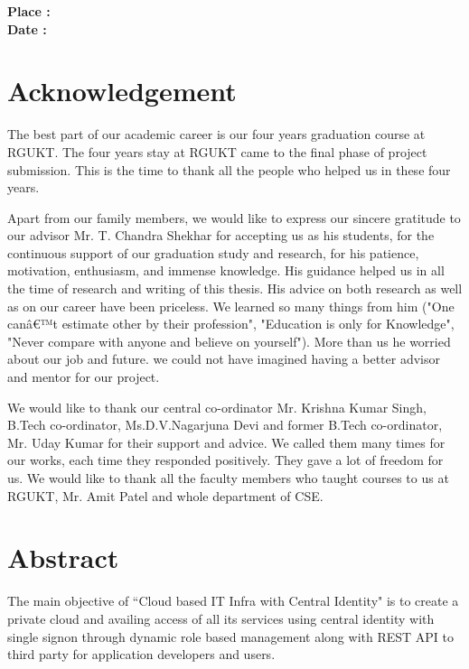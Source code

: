 \documentclass[12pt]{report}
\begin{document}
\hfill\break
\hfill\break
\hfill\break
\begin{flushleft}
\textbf{Place :} \underline{\hspace{5cm}} \\
\textbf{Date :} \underline{\hspace{5cm}}
\end{flushleft}

  
\chapter*{Acknowledgement}
\setcounter{page}{1}
\hspace{0.5cm}The best part of our academic career is our four years graduation course at RGUKT. The four years stay at RGUKT came to the final phase of project submission. This is the time to thank all the people who helped us in these four years.\newline

Apart from our family members, we would like to express our sincere gratitude to our advisor Mr. T. Chandra Shekhar for accepting us as his students, for the continuous support of our graduation study and research, for his patience, motivation, enthusiasm, and immense knowledge. His guidance helped us in all the time of research and writing of this thesis. His advice on both research as well as on our career have been priceless. We learned so many things from him ("One canâ€™t estimate other by their profession", "Education is only for Knowledge", "Never compare with anyone and believe on yourself"). More than us he worried about our job and future. we could not have imagined having a
better advisor and mentor for our project. \newline

We would like to thank our central co-ordinator Mr. Krishna Kumar Singh, B.Tech co-ordinator, Ms.D.V.Nagarjuna Devi and former B.Tech co-ordinator, Mr. Uday Kumar for their support and advice. We called them many times for our works, each time they responded positively. They gave a lot of freedom for us. We would like to thank all the faculty members who taught courses to us at RGUKT, Mr. Amit Patel and whole department of CSE. \newline

\chapter*{Abstract}

\normalsize
\hspace{0.5cm}	The main objective of ``Cloud based IT Infra with Central Identity" is to create a private cloud and availing access of all its services using central identity with single signon through dynamic role based management along with REST API to third party for application developers and users. \newline
\end{document}
